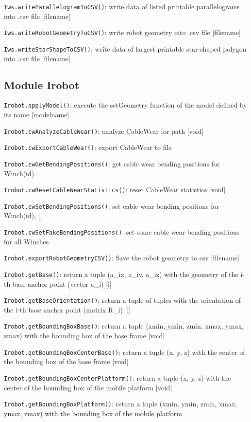 \documentclass[11pt,a4paper,onepage,openany]{book}
\begin{document}
\texttt{Iws.writeParallelogramToCSV()}: write data of listed printable parallelograms into .csv file [filename]

\texttt{Iws.writeRobotGeometryToCSV()}: write robot geometry into .csv file [filename]

\texttt{Iws.writeStarShapeToCSV()}: write data of largest printable star-shaped polygon into .csv file [filename]

\subsection{Module Irobot }
\texttt{Irobot.applyModel()}: execute the setGeometry function of the model defined by its name [modelname]

\texttt{Irobot.cwAnalyzeCableWear()}: analyze CableWear for path [void]

\texttt{Irobot.cwExportCableWear()}: export CableWear to file

\texttt{Irobot.cwGetBendingPositions()}: get cable wear bending positions for Winch(id)

\texttt{Irobot.cwResetCableWearStatistics()}: reset CableWear statistics [void]

\texttt{Irobot.cwSetBendingPositions()}: set cable wear bending positions for Winch(id), []

\texttt{Irobot.cwSetFakeBendingPositions()}: set some cable wear bending positions for all Winches

\texttt{Irobot.exportRobotGeometryCSV()}: Save the robot geometry to csv [filename]

\texttt{Irobot.getBase()}: return a tuple (a\_ix, a\_iy, a\_iz) with the geometry of the i-th base anchor point (vector a\_i) [i]

\texttt{Irobot.getBaseOrientation()}: return a tuple of tuples with the orientation of the i-th base anchor point (matrix R\_i) [i]

\texttt{Irobot.getBoundingBoxBase()}: return a tuple (xmin, ymin, zmin, xmax, ymax, zmax) with the bounding box of the base frame [void]

\texttt{Irobot.getBoundingBoxCenterBase()}: return a tuple (x, y, z) with the center of the bounding box of the base frame [void]

\texttt{Irobot.getBoundingBoxCenterPlatform()}: return a tuple (x, y, z) with the center of the bounding box of the mobile platform [void]

\texttt{Irobot.getBoundingBoxPlatform()}: return a tuple (xmin, ymin, zmin, xmax, ymax, zmax) with the bounding box of the mobile platform
\end{document}
